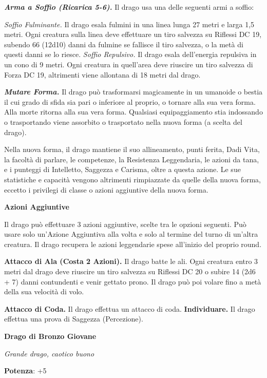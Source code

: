 \begin{multicols}{2}
\emph{\textbf{Arma a Soffio (Ricarica 5-6).}} Il drago usa una delle
seguenti armi a soffio:

\emph{Soffio Fulminante.} Il drago esala fulmini in una linea lunga 27
metri e larga 1,5 metri. Ogni creatura sulla linea deve effettuare un
tiro salvezza su Riflessi DC 19, subendo 66 (12d10) danni da fulmine se
fallisce il tiro salvezza, o la metà di questi danni se lo riesce.
\emph{Soffio Repulsivo.} Il drago esala dell'energia repulsiva in un
cono di 9 metri. Ogni creatura in quell'area deve riuscire un tiro
salvezza di Forza DC 19, altrimenti viene allontana di 18 metri dal
drago.

\emph{\textbf{Mutare Forma.}} Il drago può trasformarsi magicamente in
un umanoide o bestia il cui grado di sfida sia pari o inferiore al
proprio, o tornare alla sua vera forma. Alla morte ritorna alla sua vera
forma. Qualsiasi equipaggiamento stia indossando o trasportando viene
assorbito o trasportato nella nuova forma (a scelta del drago).

Nella nuova forma, il drago mantiene il suo allineamento, punti ferita,
Dadi Vita, la facoltà di parlare, le competenze, la Resistenza
Leggendaria, le azioni da tana, e i punteggi di Intelletto, Saggezza e
Carisma, oltre a questa azione. Le sue statistiche e capacità vengono
altrimenti rimpiazzate da quelle della nuova forma, eccetto i privilegi
di classe o azioni aggiuntive della nuova forma.

\textbf{Azioni Aggiuntive}

Il drago può effettuare 3 azioni aggiuntive, scelte tra le opzioni
seguenti. Può usare solo un'Azione Aggiuntiva alla volta e solo al
termine del turno di un'altra creatura. Il drago recupera le azioni
leggendarie spese all'inizio del proprio round.

\textbf{Attacco di Ala (Costa 2 Azioni).} Il drago batte le ali. Ogni
creatura entro 3 metri dal drago deve riuscire un tiro salvezza su Riflessi DC 20 o subire 14 (2d6 + 7) danni contundenti e venir gettato
prono. Il drago può poi volare fino a metà della sua velocità di volo.

\textbf{Attacco di Coda.} Il drago effettua un attacco di coda.
\textbf{Individuare.} Il drago effettua una prova di Saggezza
(Percezione).



\textbf{Drago di Bronzo Giovane}

\emph{Grande drago, caotico buono}

\textbf{Potenza}: +5


\end{multicols}
